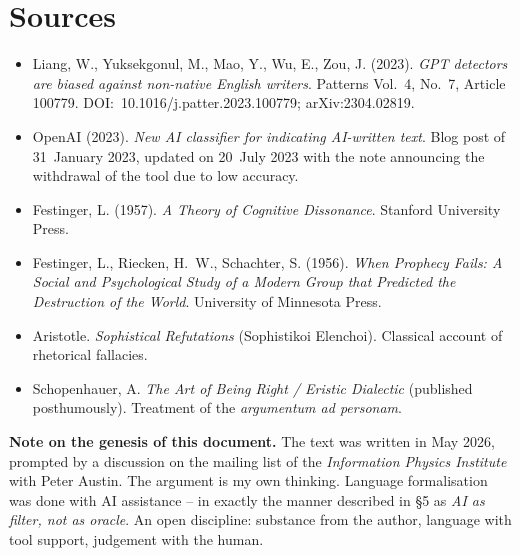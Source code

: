 \section{Sources}

\begin{itemize}[leftmargin=2em,itemsep=2pt,topsep=2pt]
  \item Liang, W., Yuksekgonul, M., Mao, Y., Wu, E., Zou, J.
        (2023). \emph{GPT detectors are biased against non-native
        English writers}. Patterns Vol.~4, No.~7, Article 100779.
        DOI:~10.1016/j.patter.2023.100779; arXiv:2304.02819.
  \item OpenAI (2023). \emph{New AI classifier for indicating
        AI-written text}. Blog post of 31~January 2023, updated on
        20~July 2023 with the note announcing the withdrawal of the
        tool due to low accuracy.
  \item Festinger, L. (1957). \emph{A Theory of Cognitive
        Dissonance}. Stanford University Press.
  \item Festinger, L., Riecken, H.~W., Schachter, S. (1956).
        \emph{When Prophecy Fails: A Social and Psychological
        Study of a Modern Group that Predicted the Destruction of
        the World}. University of Minnesota Press.
  \item Aristotle. \emph{Sophistical Refutations} (Sophistikoi
        Elenchoi). Classical account of rhetorical fallacies.
  \item Schopenhauer, A. \emph{The Art of Being Right / Eristic
        Dialectic} (published posthumously). Treatment of the
        \emph{argumentum ad personam}.
\end{itemize}

\bigskip

\textbf{Note on the genesis of this document.} The text was written
in May 2026, prompted by a discussion on the mailing list of the
\emph{Information Physics Institute} with Peter Austin. The argument
is my own thinking. Language formalisation was done with AI
assistance -- in exactly the manner described in §5 as \emph{AI as
filter, not as oracle}. An open discipline: substance from the
author, language with tool support, judgement with the human.
